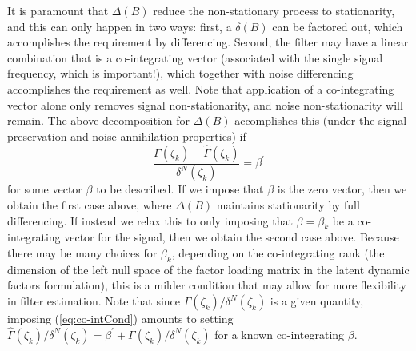 \documentclass[a4paper]{book}
\begin{document}
  It is paramount that $\Delta (B)$ reduce the non-stationary
  process to stationarity, and this can only happen in two ways:
  first, a $\delta (B)$ can be factored out, which accomplishes the
  requirement by differencing.  Second, the filter may have a linear
  combination that is a co-integrating vector (associated with the
  single signal frequency, which is important!), which together with
  noise differencing accomplishes the requirement as well.  Note
  that application of a co-integrating vector alone only removes
  signal non-stationarity, and noise non-stationarity will remain.
  The above decomposition for $\Delta (B)$ accomplishes this (under
  the signal preservation and noise annihilation properties) if
 \begin{equation}
  \label{eq:co-intCond}
 \frac{ \Gamma (\zeta_k) - \widehat{\Gamma} (\zeta_k) }{ \delta^N
  (\zeta_k) } = \beta^{\prime}
 \end{equation}
  for some vector $\beta$ to be described.  If we impose that
  $\beta$ is the zero vector, then we obtain the first case above,
  where $\Delta (B)$ maintains stationarity by full differencing.
  If instead we relax this to only imposing that $\beta = \beta_k$
  be a co-integrating vector for the signal, then we obtain the
  second case above.  Because there may be many choices for
  $\beta_k$, depending on the co-integrating rank (the dimension of
  the left null space of the factor loading matrix in the latent
  dynamic factors formulation), this is a milder condition that may
  allow for more flexibility in filter estimation.  Note that since
  $\Gamma (\zeta_k) / \delta^N (\zeta_k)$ is a given quantity,
  imposing (\ref{eq:co-intCond}) amounts to setting $\widehat{\Gamma}
  (\zeta_k) / \delta^N (\zeta_k) = \beta^{\prime} + \Gamma (\zeta_k) /
  \delta^N (\zeta_k)$ for a known co-integrating $\beta$.
\end{document}
